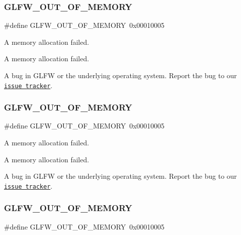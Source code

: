 \subsubsection{\texorpdfstring{G\+L\+F\+W\+\_\+\+O\+U\+T\+\_\+\+O\+F\+\_\+\+M\+E\+M\+O\+RY}{GLFW\_OUT\_OF\_MEMORY}\hspace{0.1cm}{\footnotesize\ttfamily [1/5]}}
{\footnotesize\ttfamily \#define G\+L\+F\+W\+\_\+\+O\+U\+T\+\_\+\+O\+F\+\_\+\+M\+E\+M\+O\+RY~0x00010005}



A memory allocation failed. 

A memory allocation failed.

A bug in G\+L\+FW or the underlying operating system. Report the bug to our \href{https://github.com/glfw/glfw/issues}{\tt issue tracker}. \mbox{\label{group__errors_ga9023953a2bcb98c2906afd071d21ee7f}} 
\subsubsection{\texorpdfstring{G\+L\+F\+W\+\_\+\+O\+U\+T\+\_\+\+O\+F\+\_\+\+M\+E\+M\+O\+RY}{GLFW\_OUT\_OF\_MEMORY}\hspace{0.1cm}{\footnotesize\ttfamily [2/5]}}
{\footnotesize\ttfamily \#define G\+L\+F\+W\+\_\+\+O\+U\+T\+\_\+\+O\+F\+\_\+\+M\+E\+M\+O\+RY~0x00010005}



A memory allocation failed. 

A memory allocation failed.

A bug in G\+L\+FW or the underlying operating system. Report the bug to our \href{https://github.com/glfw/glfw/issues}{\tt issue tracker}. \mbox{\label{group__errors_ga9023953a2bcb98c2906afd071d21ee7f}} 
\subsubsection{\texorpdfstring{G\+L\+F\+W\+\_\+\+O\+U\+T\+\_\+\+O\+F\+\_\+\+M\+E\+M\+O\+RY}{GLFW\_OUT\_OF\_MEMORY}\hspace{0.1cm}{\footnotesize\ttfamily [3/5]}}
{\footnotesize\ttfamily \#define G\+L\+F\+W\+\_\+\+O\+U\+T\+\_\+\+O\+F\+\_\+\+M\+E\+M\+O\+RY~0x00010005}



